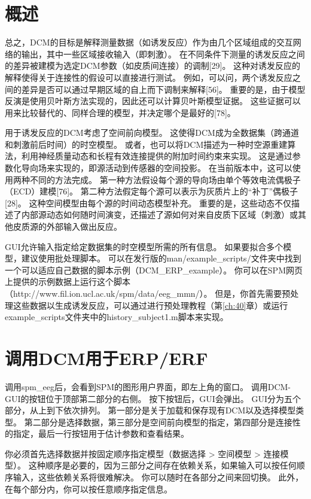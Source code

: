 \section{概述}

总之，DCM的目标是解释测量数据（如诱发反应）作为由几个区域组成的交互网络的输出，其中一些区域接收输入（即刺激）。
在不同条件下测量的诱发反应之间的差异被建模为选定DCM参数（如皮质间连接）的调制[29]。
这种对诱发反应的解释使得关于连接性的假设可以直接进行测试。
例如，可以问，两个诱发反应之间的差异是否可以通过早期区域的自上而下调制来解释[56]。
重要的是，由于模型反演是使用贝叶斯方法实现的，因此还可以计算贝叶斯模型证据。
这些证据可以用来比较替代的、同样合理的模型，并决定哪个是最好的[78]。

用于诱发反应的DCM考虑了空间前向模型。
这使得DCM成为全数据集（跨通道和刺激前后时间）的时空模型。
或者，也可以将DCM描述为一种时空源重建算法，利用神经质量动态和长程有效连接提供的附加时间约束来实现。
这是通过参数化导向场来实现的，即源活动到传感器的空间投影。
在当前版本中，这可以使用两种不同的方法完成。
第一种方法假设每个源的导向场由单个等效电流偶极子（ECD）建模[76]。
第二种方法假定每个源可以表示为灰质片上的“补丁”偶极子[28]。
这种空间模型由每个源的时间动态模型补充。
重要的是，这些动态不仅描述了内部源动态如何随时间演变，还描述了源如何对来自皮质下区域（刺激）或其他皮质源的外部输入做出反应。

GUI允许输入指定给定数据集的时空模型所需的所有信息。
如果要拟合多个模型，建议使用批处理脚本。
可以在发行版的man/example\_scripts/文件夹中找到一个可以适应自己数据的脚本示例（DCM\_ERP\_example）。
你可以在SPM网页上提供的示例数据上运行这个脚本（http://www.fil.ion.ucl.ac.uk/spm/data/eeg\_mmn/）。
但是，你首先需要预处理这些数据以生成诱发反应，可以通过进行预处理教程（第\ref{ch:40}章）或运行example\_scripts文件夹中的history\_subject1.m脚本来实现。


\section{调用DCM用于ERP/ERF}

调用spm\_eeg后，会看到SPM的图形用户界面，即左上角的窗口。
调用DCM-GUI的按钮位于顶部第二部分的右侧。
按下按钮后，GUI会弹出。
GUI分为五个部分，从上到下依次排列。
第一部分是关于加载和保存现有DCM以及选择模型类型。
第二部分是选择数据，第三部分是空间前向模型的指定，第四部分是连接性的指定，最后一行按钮用于估计参数和查看结果。

你必须首先选择数据并按固定顺序指定模型（数据选择 > 空间模型 > 连接模型）。
这种顺序是必要的，因为三部分之间存在依赖关系，如果输入可以按任何顺序输入，这些依赖关系将很难解决。
你可以随时在各部分之间来回切换。
此外，在每个部分内，你可以按任意顺序指定信息。


